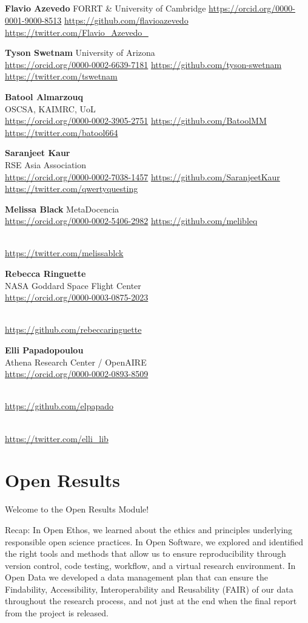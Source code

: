 \documentclass[
  letterpaper,
  DIV=11,
  numbers=noendperiod]{scrreport}
\begin{document}
\hypertarget{section}{%
\chapter{}\label{section}}

\textbf{Flavio Azevedo} FORRT \& University of Cambridge
\url{https://orcid.org/0000-0001-9000-8513}
\url{https://github.com/flavioazevedo}
\url{https://twitter.com/Flavio_Azevedo_}

\textbf{Tyson Swetnam} University of Arizona\\
\url{https://orcid.org/0000-0002-6639-7181}
\url{https://github.com/tyson-swetnam}
\url{https://twitter.com/tswetnam}

\textbf{Batool Almarzouq}\\
OSCSA, KAIMRC, UoL\\
\url{https://orcid.org/0000-0002-3905-2751}
\url{https://github.com/BatoolMM} \url{https://twitter.com/batool664}

\textbf{Saranjeet Kaur}\\
RSE Asia Association\\
\url{https://orcid.org/0000-0002-7038-1457}
\url{https://github.com/SaranjeetKaur}
\url{https://twitter.com/qwertyquesting}

\textbf{Melissa Black} MetaDocencia\\
\url{https://orcid.org/0000-0002-5406-2982}
\url{https://github.com/melibleq}\strut \\
\url{https://twitter.com/melissablck}

\textbf{Rebecca Ringuette}\\
NASA Goddard Space Flight Center\\
\url{https://orcid.org/0000-0003-0875-2023}\strut \\
\url{https://github.com/rebeccaringuette}

\textbf{Elli Papadopoulou}\\
Athena Research Center / OpenAIRE\\
\url{https://orcid.org/0000-0002-0893-8509}\strut \\
\url{https://github.com/elpapado}\strut \\
\url{https://twitter.com/elli_lib}

\part{Open Results}

Welcome to the Open Results Module!

Recap: In Open Ethos, we learned about the ethics and principles
underlying responsible open science practices. In Open Software, we
explored and identified the right tools and methods that allow us to
ensure reproducibility through version control, code testing, workflow,
and a virtual research environment. In Open Data we developed a data
management plan that can ensure the Findability, Accessibility,
Interoperability and Reusability (FAIR) of our data throughout the
research process, and not just at the end when the final report from the
project is released.
\end{document}
